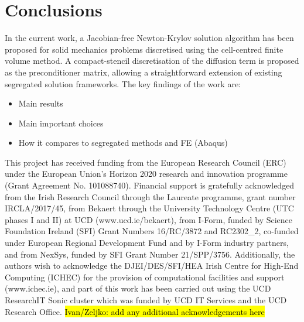 \documentclass[sn-mathphys,Numbered]{sn-jnl}%
\begin{document}
\section{Conclusions} \label{sec:conclusion}
In the current work, a Jacobian-free Newton-Krylov solution algorithm has been proposed for solid mechanics problems discretised using the cell-centred finite volume method.
A compact-stencil discretisation of the diffusion term is proposed as the preconditioner matrix, allowing a straightforward extension of existing segregated solution frameworks.
The key findings of the work are:
\begin{itemize}
	\item Main results
	\item Main important choices
	\item How it compares to segregated methods and FE (Abaqus)
\end{itemize}



\backmatter

This project has received funding from the European Research Council (ERC) under the European Union’s Horizon 2020 research and innovation programme (Grant Agreement No. 101088740).
Financial support is gratefully acknowledged from the Irish Research Council through the Laureate programme, grant number IRCLA/2017/45, from Bekaert through the University Technology Centre (UTC phases I and II) at UCD (www.ucd.ie/bekaert), from I-Form, funded by Science Foundation Ireland (SFI) Grant Numbers 16/RC/3872 and {RC2302\_2}, co-funded under European Regional Development Fund and by I-Form industry partners, and from NexSys, funded by SFI Grant Number 21/SPP/3756.
Additionally, the authors wish to acknowledge the DJEI/DES/SFI/HEA Irish Centre for High-End Computing (ICHEC) for the provision of computational facilities and support (www.ichec.ie), and part of this work has been carried out using the UCD ResearchIT Sonic cluster which was funded by UCD IT Services and the UCD Research Office.
\hl{Ivan/Zeljko: add any additional acknowledgements here}



\newpage
\end{document}
